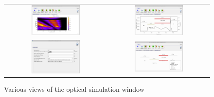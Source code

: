 \begin{figure}[H]
\centering
\begin{tabular}{ c c }

\includegraphics[width=0.5\textwidth,height=0.4\textwidth]{./images/opticalsimulation.png}

&
\includegraphics[width=0.5\textwidth,height=0.4\textwidth]{./images/opticalsimulation1.png}

\\
\includegraphics[width=0.5\textwidth,height=0.4\textwidth]{./images/opticalsimulation2.png}

&
\includegraphics[width=0.5\textwidth,height=0.4\textwidth]{./images/opticalsimulation3.png}

\\
\end{tabular}
\caption{Various views of the optical simulation window}
\label{fig:transfermatrix1}
\end{figure}



